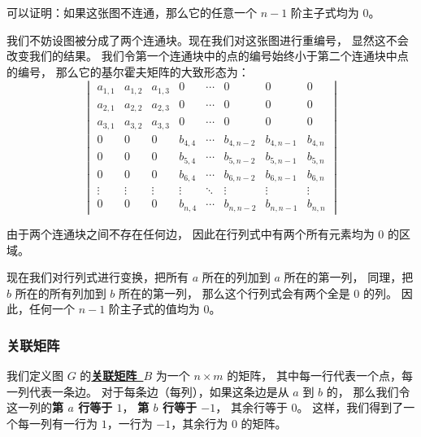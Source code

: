 \documentclass[UTF8]{article}
\begin{document}

	可以证明：如果这张图不连通，那么它的任意一个 $n - 1$ 阶主子式均为 $0$。

	\bigskip


	我们不妨设图被分成了两个连通块。现在我们对这张图进行重编号，
	显然这不会改变我们的结果。
	我们令第一个连通块中的点的编号始终小于第二个连通块中点的编号，
	那么它的基尔霍夫矩阵的大致形态为：
	\begin{equation*}
		\begin{vmatrix}
			a_{1, 1} & a_{1, 2} & a_{1, 3} & 0 & \cdots & 0 & 0 & 0
			\\
			a_{2, 1} & a_{2, 2} & a_{2, 3} & 0 & \cdots & 0 & 0 & 0
			\\
			a_{3, 1} & a_{3, 2} & a_{3, 3} & 0 & \cdots & 0 & 0 & 0
			\\
			0 & 0 & 0 & b_{4, 4} & \cdots & b_{4, n - 2} & b_{4, n - 1} & b_{4, n}
			\\
			0 & 0 & 0 & b_{5, 4} & \cdots & b_{5, n - 2} & b_{5, n - 1} & b_{5, n}
			\\
			0 & 0 & 0 & b_{6, 4} & \cdots & b_{6, n - 2} & b_{6, n - 1} & b_{6, n}
			\\
			\vdots & \vdots & \vdots & \vdots & \ddots &  \vdots & \vdots & \vdots
			\\
			0 & 0 & 0 & b_{n, 4} & \cdots & b_{n, n - 2} & b_{n, n - 1} & b_{n, n}
		\end{vmatrix}
	\end{equation*}

	由于两个连通块之间不存在任何边，
	因此在行列式中有两个所有元素均为 $0$ 的区域。

	现在我们对行列式进行变换，把所有 $a$ 所在的列加到 $a$ 所在的第一列，
	同理，把 $b$ 所在的所有列加到 $b$ 所在的第一列，
	那么这个行列式会有两个全是 $0$ 的列。
	因此，任何一个 $n - 1$ 阶主子式的值均为 $0$。

	\subsubsection{关联矩阵}

	我们定义图 $G$ 的\textbf{\uline{关联矩阵~$B$}} 为一个 $n \times m$ 的矩阵，
	其中每一行代表一个点，每一列代表一条边。
	对于每条边（每列），如果这条边是从 $a$ 到 $b$ 的，
	那么我们令这一列的\textbf{第 $a$ 行等于 $1$}，
	\textbf{第 $b$ 行等于 $-1$}，
	其余行等于 $0$。
	这样，我们得到了一个每一列有一行为 $1$，一行为 $-1$，其余行为 $0$ 的矩阵。
	
\end{document}
